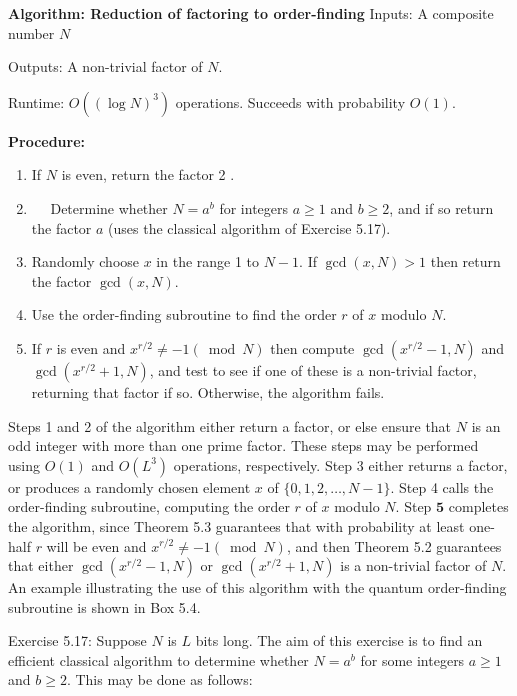 \textbf{Algorithm: Reduction of factoring to order-finding}
Inputs: A composite number $N$

Outputs: A non-trivial factor of $N$.

Runtime: $O\left((\log N)^{3}\right)$ operations. Succeeds with probability $O(1)$.

\textbf{Procedure:}
\begin{enumerate}
    \item If $N$ is even, return the factor 2 .
    \item $\quad$ Determine whether $N=a^{b}$ for integers $a \geq 1$ and $b \geq 2$, and if so return the factor $a$ (uses the classical algorithm of Exercise 5.17).
    \item Randomly choose $x$ in the range 1 to $N-1$. If $\operatorname{gcd}(x, N)>1$ then return the factor $\operatorname{gcd}(x, N)$.
    \item Use the order-finding subroutine to find the order $r$ of $x$ modulo $N$.
    \item If $r$ is even and $x^{r / 2} \neq-1(\bmod N)$ then compute $\operatorname{gcd}\left(x^{r / 2}-1, N\right)$ and $\operatorname{gcd}\left(x^{r / 2}+1, N\right)$, and test to see if one of these is a non-trivial factor, returning that factor if so. Otherwise, the algorithm fails.

\end{enumerate}

Steps 1 and 2 of the algorithm either return a factor, or else ensure that $N$ is an odd integer with more than one prime factor. These steps may be performed using $O(1)$ and $O\left(L^{3}\right)$ operations, respectively. Step 3 either returns a factor, or produces a randomly chosen element $x$ of $\{0,1,2, \ldots, N-1\}$. Step 4 calls the order-finding subroutine, computing the order $r$ of $x$ modulo $N$. Step $\mathbf{5}$ completes the algorithm, since Theorem 5.3 guarantees that with probability at least one-half $r$ will be even and $x^{r / 2} \neq-1(\bmod N)$, and then Theorem 5.2 guarantees that either $\operatorname{gcd}\left(x^{r / 2}-1, N\right)$ or $\operatorname{gcd}\left(x^{r / 2}+1, N\right)$ is a non-trivial factor of $N$. An example illustrating the use of this algorithm with the quantum order-finding subroutine is shown in Box 5.4.

Exercise 5.17: Suppose $N$ is $L$ bits long. The aim of this exercise is to find an efficient classical algorithm to determine whether $N=a^{b}$ for some integers $a \geq 1$ and $b \geq 2$. This may be done as follows:

